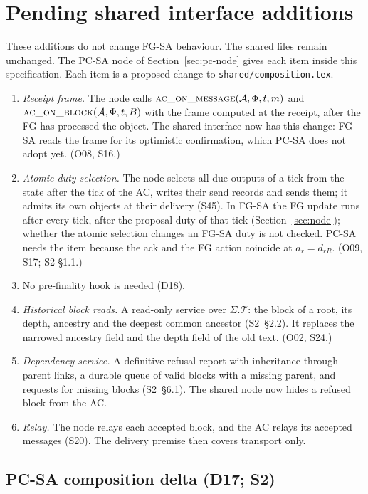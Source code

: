 \documentclass{article}
\newcommand{\T}{\mathcal T}
\newcommand{\AC}{\mathcal A}
\newcommand{\Fr}{\Phi}
\newcommand{\nm}[1]{\nolinkurl{#1}}
\begin{document}
\section{Pending shared interface additions}\label{sec:pending-interface}

These additions do not change FG-SA behaviour.  The shared files remain
unchanged.  The PC-SA node of Section~\ref{sec:pc-node} gives each item
inside this specification.  Each item is a proposed change to
\nm{shared/composition.tex}.

\begin{enumerate}
\item[(a)] \emph{Receipt frame.}  The node calls
$\Call{ac\_on\_message}{\AC,\Fr,t,m}$ and
$\Call{ac\_on\_block}{\AC,\Fr,t,B}$ with the frame computed at the
receipt, after the FG has processed the object.  The shared interface
now has this change: FG-SA reads the frame for its optimistic confirmation, which
PC-SA does not adopt yet.  (O08, S16.)
\item[(b)] \emph{Atomic duty selection.}  The node selects all due
outputs of a tick from the state after the tick of the AC, writes their
send records and sends them; it admits its own objects at their delivery
(S45).  In
FG-SA the FG update runs after every tick, after the proposal duty of
that tick (Section~\ref{sec:node}); whether the atomic selection changes
an FG-SA duty is not checked.  PC-SA needs the item because the ack and
the FG action coincide at $a_r=d_{rR}$.  (O09, S17; S2 \S1.1.)
\item[(c)] No pre-finality hook is needed (D18).
\item[(d)] \emph{Historical block reads.}  A read-only service over
$\Sigma.\T$: the block of a root, its depth, ancestry and the deepest
common ancestor (S2~\S2.2).  It replaces the narrowed ancestry field and
the depth field of the old text.  (O02, S24.)
\item[(e)] \emph{Dependency service.}  A definitive refusal report with
inheritance through parent links, a durable queue of valid blocks with a
missing parent, and requests for missing blocks (S2~\S6.1).  The shared
node now hides a refused block from the AC.
\item[(f)] \emph{Relay.}  The node relays each accepted block, and the AC
relays its accepted messages (S20).  The delivery premise then covers
transport only.
\end{enumerate}

\subsection{PC-SA composition delta (D17; S2)}
\end{document}
